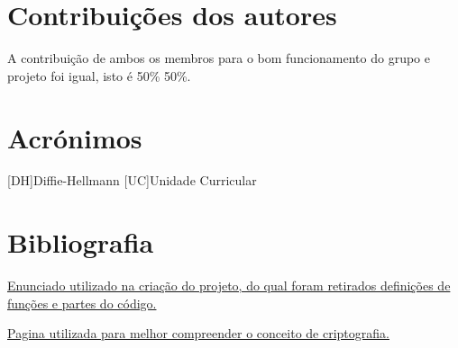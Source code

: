 \documentclass{report}
\begin{document}
\chapter*{Contribuições dos autores}
A contribuição de ambos os membros para o bom funcionamento do grupo e projeto foi igual, isto é 50\% 50\%.

\chapter*{Acrónimos}
\begin{acronym}
[DH]{Diffie-Hellmann}
[UC]{Unidade Curricular}
\end{acronym}


\chapter{Bibliografia}


 \href{https://elearning.ua.pt/pluginfile.php/430960/mod_resource/content/13/ap2-2021.pdf}{Enunciado utilizado na criação do projeto, do qual foram retirados definições de funções e partes do código.}
 \newline
 
 \href{https://en.wikipedia.org/wiki/Cryptography}{Pagina utilizada para melhor compreender o conceito de criptografia.}


\printbibliography
\end{document}
